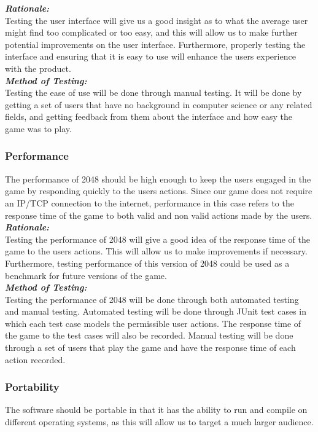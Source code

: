 \documentclass[12pt]{article}
\begin{document}
\textbf{\emph{Rationale:}}\\
Testing the user interface will give us a good insight as to what the average 
user might find too complicated or too easy, and this will allow us to make 
further potential improvements on the user interface. Furthermore, properly 
testing the interface and ensuring that it is easy to use will enhance the 
users experience with the product. \\

\textbf{\emph{Method of Testing:}}\\
Testing the ease of use will be done through manual testing. It will be done by 
getting a set of users that have no background in computer science or any 
related fields, and getting feedback from them about the interface and how easy 
the game was to play.  

\subsubsection{Performance}
The performance of 2048 should be high enough to keep the users engaged in the 
game by responding quickly to the users actions. Since our game does not 
require an IP/TCP connection to the internet, performance in this case refers 
to the response time of the game to both valid and non valid actions made by 
the users. \\

\textbf{\emph{Rationale:}}\\
Testing the performance of 2048 will give a good idea of the response time of 
the game to the users actions. This will allow us to make improvements if 
necessary. Furthermore, testing performance of this version of 2048 could be 
used as a benchmark for future versions of the game. \\

\textbf{\emph{Method of Testing:}}\\
Testing the performance of 2048 will be done through both automated testing and 
manual testing. Automated testing will be done through JUnit test cases in 
which each test case models the permissible user actions. The response time of 
the game to the test cases will also be recorded. Manual testing will be done 
through a set of users that play the game and have the response time of each 
action recorded. 

\subsubsection{Portability}
The software should be portable in that it has the ability to run and compile 
on different operating systems, as this will allow us to target a much larger 
audience. \\
\end{document}
